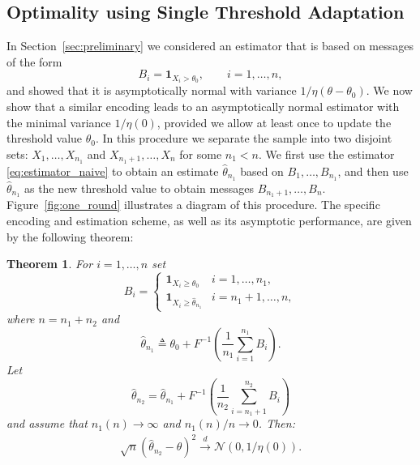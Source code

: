 \documentclass[letterpaper, 11pt]{IEEEtran}      %
\newtheorem{thm}{\bf{Theorem}}
\newcommand{\Ncal}{\mathcal{N}}
\begin{document}
\subsection{Optimality using Single Threshold Adaptation}
In Section~\ref{sec:preliminary} we considered an estimator that is based on messages of the form 
\[
B_i = \mathbf 1_{X_i > \theta_0},\qquad i=1,\ldots,n,
\]
and showed that it is asymptotically normal with variance $1/\eta(\theta-\theta_0)$.
%
We now show that a similar encoding leads to an asymptotically normal estimator with the minimal variance $1/\eta(0)$, provided we allow at least once to update the threshold value $\theta_0$. 
%
In this procedure we separate the sample into two disjoint sets: $X_1,\ldots,X_{n_1}$ and $X_{n_1+1},\ldots,X_n$ for some $n_1 < n$.
We first use the estimator \eqref{eq:estimator_naive} to obtain an estimate $\hat{\theta}_{n_1}$ based on $B_1,\ldots,B_{n_1}$, and then use $\hat{\theta}_{n_1}$ as the new threshold value to obtain messages $B_{n_1+1}, \ldots, B_n$. Figure~\ref{fig:one_round} illustrates a diagram of this procedure. 
%
The specific encoding and estimation scheme, as well as its asymptotic performance, are given by the following theorem:
\begin{thm}
For $i=1,\ldots,n$ set
\[
B_i = \begin{cases}
 \mathbf 1_{X_i \geq \theta_0} & i = 1,\ldots,n_1, \\
 \mathbf 1_{X_i \geq \hat{\theta}_{n_1} }& i={n_1+1,\ldots,n},
\end{cases}
\]
where $n = n_1+ n_2$ and 
\[
\hat{\theta}_{n_1} \triangleq \theta_0 + F^{-1}\left(
\frac{1}{n_1} \sum_{i=1}^{n_1} B_i 
 \right).
\] 
Let 
\[
\hat{\theta}_{n_2}  = \hat{\theta}_{n_1} +  F^{-1} \left( \frac{1}{n_2} \sum_{i=n_1+1}^{n_2} B_i \right)
\]
and assume that $n_1(n) \rightarrow \infty$ and $n_1(n)/n \rightarrow 0$. Then:
\begin{align*}
 \sqrt{n} \left( \hat{\theta}_{n_2} - \theta  \right)^2  \overset{d}{\longrightarrow}  \Ncal\left( 0, 1/\eta(0) \right).
\end{align*}
\end{thm}
%
%
\end{document}
